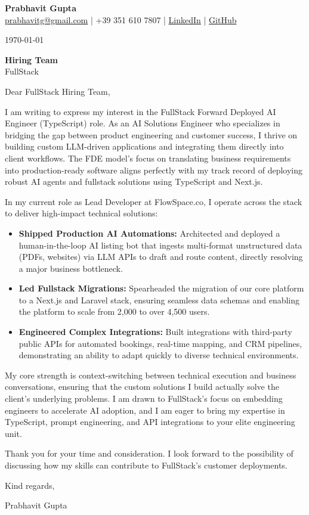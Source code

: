 \documentclass[11pt,a4paper]{article}
\begin{document}
\begin{center}
    \Huge{\textbf{Prabhavit Gupta}} \\
    \vspace{0.2cm}
    \normalsize
    \href{mailto:prabhavitg@gmail.com}{prabhavitg@gmail.com} | +39 351 610 7807 | \href{https://linkedin.com/in/prabhavit}{LinkedIn} | \href{https://github.com/prab-gupta}{GitHub}
\end{center}

\vspace{1cm}

\today

\textbf{Hiring Team} \\
FullStack

Dear FullStack Hiring Team,

I am writing to express my interest in the FullStack Forward Deployed AI Engineer (TypeScript) role. As an AI Solutions Engineer who specializes in bridging the gap between product engineering and customer success, I thrive on building custom LLM-driven applications and integrating them directly into client workflows. The FDE model's focus on translating business requirements into production-ready software aligns perfectly with my track record of deploying robust AI agents and fullstack solutions using TypeScript and Next.js.

In my current role as Lead Developer at FlowSpace.co, I operate across the stack to deliver high-impact technical solutions:

\begin{itemize}
    \item \textbf{Shipped Production AI Automations:} Architected and deployed a human-in-the-loop AI listing bot that ingests multi-format unstructured data (PDFs, websites) via LLM APIs to draft and route content, directly resolving a major business bottleneck.
    \item \textbf{Led Fullstack Migrations:} Spearheaded the migration of our core platform to a Next.js and Laravel stack, ensuring seamless data schemas and enabling the platform to scale from 2,000 to over 4,500 users.
    \item \textbf{Engineered Complex Integrations:} Built integrations with third-party public APIs for automated bookings, real-time mapping, and CRM pipelines, demonstrating an ability to adapt quickly to diverse technical environments.
\end{itemize}

My core strength is context-switching between technical execution and business conversations, ensuring that the custom solutions I build actually solve the client's underlying problems. I am drawn to FullStack's focus on embedding engineers to accelerate AI adoption, and I am eager to bring my expertise in TypeScript, prompt engineering, and API integrations to your elite engineering unit.

Thank you for your time and consideration. I look forward to the possibility of discussing how my skills can contribute to FullStack's customer deployments.

Kind regards,

Prabhavit Gupta
\end{document}

